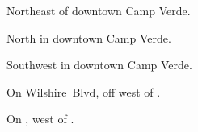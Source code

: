 
\begin{LocationList}

Northeast of downtown Camp Verde.

North in downtown Camp Verde.

Southwest in downtown Camp Verde.

On Wilshire~Blvd, off  west of  .

\Location{\TruckStop \Gas \Rest}
On , west of  .

\end{LocationList}
